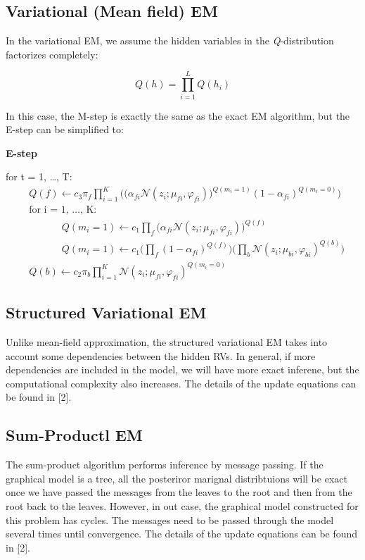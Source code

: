 \documentclass{article} %
\begin{document}
\subsection{Variational (Mean field) EM}
\label{variational_em}

In the variational EM, we assume the hidden variables in the \textit{Q}-distribution factorizes completely:

\begin{equation}
Q(h) = \prod_{i=1}^LQ(h_i) 
\label{eq:eq9}
\end{equation}

In this case, the M-step is exactly the same as the exact EM algorithm, but the E-step can be simplified to:

\textbf{E-step}

for t = 1, \ldots , T:
\begin{align*} 
&Q(f) \leftarrow c_3\pi_f\prod_{i=1}^K\Bigg(\Big(\alpha_{fi}\mathcal{N}(z_i;\mu_{fi},\varphi_{fi})\Big)^{Q(m_i=1)} (1-\alpha_{fi})^{Q(m_i=0)} \Bigg) \\
&\text{for i = 1, \ldots , K: } \\
&\text{ }\text{ }\text{ }\text{ }\text{ }Q(m_i = 1) \leftarrow c_1\prod_{f}\Bigg(\alpha_{fi}\mathcal{N}(z_i;\mu_{fi},\varphi_{fi})\Bigg)^{Q(f)}\\
&\text{ }\text{ }\text{ }\text{ }\text{ }Q(m_i = 1) \leftarrow c_1\Bigg(\prod_{f}(1-\alpha_{fi})^{Q(f)}\Bigg)\Bigg(\prod_{b}\mathcal{N}(z_i;\mu_{bi},\varphi_{bi})^{Q(b)}\Bigg)\\
&Q(b) \leftarrow c_2\pi_b\prod_{i=1}^K\mathcal{N}(z_i;\mu_{fi},\varphi_{fi})^{Q(m_i=0)}
\end{align*} 

\subsection{Structured Variational EM}
\label{structured_em}
Unlike mean-field approximation, the structured variational EM takes into account some dependencies between the hidden RVs. In general, if more dependencies are included in the model, we will have more exact inferene, but the computational complexity also increases. The details of the update equations can be found in [2].

\subsection{Sum-Productl EM}
\label{sum_product_em}
The sum-product algorithm performs inference by message passing. If the graphical model is a tree, all the posteriror marignal distribtuions will be exact once we have passed the messages from the leaves to the root and then from the root back to the leaves. However, in out case, the graphical model constructed for this problem has cycles. The messages need to be passed through the model several times until convergence.  The details of the update equations can be found in [2].
\end{document}
